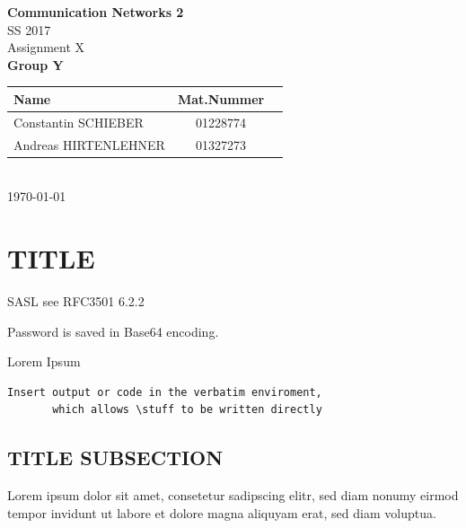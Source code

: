\documentclass[parskip=full]{scrartcl}
\begin{document}
\begin{titlepage}
    \centering
    \vspace*{2cm}
    {\Huge \textbf{Communication Networks 2}}\\
    SS 2017\\
    \vspace*{1cm}
    {\Large Assignment X}
    \\\vspace*{3cm}
    {\Large \textbf{Group Y}}\\
    \vspace*{1cm}
    {\large 
        \begin{tabular}{l c c}
            Name & Mat.Nummer \\ \hline
            Constantin SCHIEBER & 01228774 \\
            Andreas HIRTENLEHNER & 01327273
        \end{tabular}
    }
    \\\vspace*{7cm}
    \today
\end{titlepage}

\section{TITLE}

SASL see RFC3501 6.2.2

Password is saved in Base64 encoding.

Lorem Ipsum

\begin{verbatim}
Insert output or code in the verbatim enviroment,
       which allows \stuff to be written directly
\end{verbatim}

\subsection{TITLE SUBSECTION}
Lorem ipsum dolor sit amet, consetetur sadipscing elitr, sed diam nonumy eirmod tempor invidunt ut labore et dolore magna aliquyam erat, sed diam voluptua.

\end{document}
